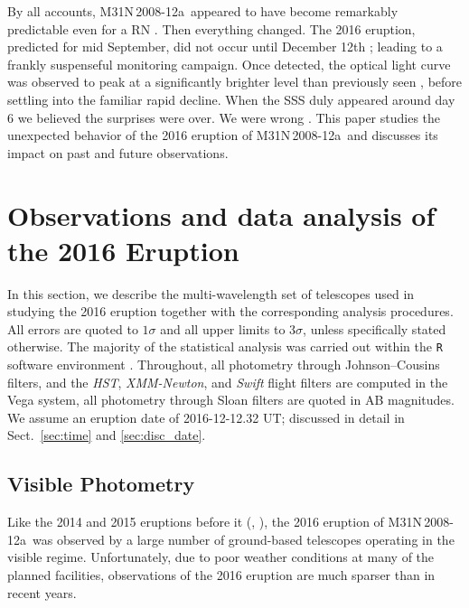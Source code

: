 \documentclass[twocolumn,tighten]{aastex6}
\def\xmmk{{\it XMM-Newton}}
\def\nova{{M31N\,2008-12a~}}
\def\novak{{M31N\,2008-12a}}
\newcommand{\otwok}{\citetalias{2015A&A...580A..45D}}
\newcommand{\othreek}{\citetalias{2016ApJ...833..149D}}
\begin{document}
By all accounts, \nova appeared to have become remarkably predictable even for a RN \citep[see also][for a recent review]{2017ASPC..509..515D}.  Then everything changed. The 2016 eruption, predicted for mid September, did not occur until December 12th \citep{2016ATel.9848....1I}; leading to a frankly suspenseful monitoring campaign. Once detected, the optical light curve was observed to peak at a significantly brighter level than previously seen \citep{2016ATel.9857....1E,2016ATel.9861....1B}, before settling into the familiar rapid decline. When the SSS duly appeared around day 6 \citep{2016ATel.9872....1H} we believed the surprises were over. We were wrong \citep{2016ATel.9907....1H}. This paper studies the unexpected behavior of the 2016 eruption of \nova and discusses its impact on past and future observations.

\section{Observations and data analysis of the 2016 Eruption}\label{sec:observations}

In this section, we describe the multi-wavelength set of telescopes used in studying the 2016 eruption together with the corresponding analysis procedures. All errors are quoted to $1\sigma$ and all upper limits to $3\sigma$, unless specifically stated otherwise. The majority of the statistical analysis was carried out within the \texttt{R} software environment \citep{R_manual}.  Throughout, all photometry through Johnson--Cousins filters, and the {\it HST}, \xmmk, and {\it Swift} flight filters are computed in the Vega system, all photometry through Sloan filters are quoted in AB magnitudes. We assume an eruption date of 2016-12-12.32 UT; discussed in detail in Sect.~\ref{sec:time} and \ref{sec:disc_date}.

\subsection{Visible Photometry}\label{sec:optical_photometry}

Like the 2014 and 2015 eruptions before it (\otwok, \othreek), the 2016 eruption of \novak\ was observed by a large number of ground-based telescopes operating in the visible regime.  Unfortunately, due to poor weather conditions at many of the planned facilities, observations of the 2016 eruption are much sparser than in recent years.
\end{document}
